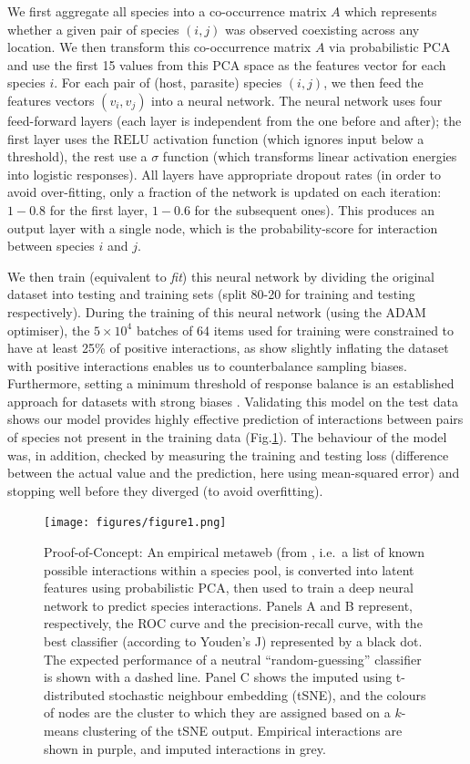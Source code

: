 We first aggregate all species into a co-occurrence matrix \(A\) which
represents whether a given pair of species \((i,j)\) was observed
coexisting across any location. We then transform this co-occurrence
matrix \(A\) via probabilistic PCA \cite{Tipping1999ProPri} and use the
first 15 values from this PCA space as the features vector for each
species \(i\). For each pair of (host, parasite) species \((i,j)\), we
then feed the features vectors \((v_i, v_j)\) into a neural network. The
neural network uses four feed-forward layers (each layer is independent
from the one before and after); the first layer uses the \(\text{RELU}\)
activation function (which ignores input below a threshold), the rest
use a \(\sigma\) function (which transforms linear activation energies
into logistic responses). All layers have appropriate dropout rates (in
order to avoid over-fitting, only a fraction of the network is updated
on each iteration: \(1-0.8\) for the first layer, \(1-0.6\) for the
subsequent ones). This produces an output layer with a single node,
which is the probability-score for interaction between species \(i\) and
\(j\).

We then train (equivalent to \emph{fit}) this neural network by dividing
the original dataset into testing and training sets (split 80-20 for
training and testing respectively). During the training of this neural
network (using the ADAM optimiser), the \(5\times 10^4\) batches of 64
items used for training were constrained to have at least 25\% of
positive interactions, as \cite{Poisot2021ImpMam} show slightly inflating the
dataset with positive interactions enables us to counterbalance sampling
biases. Furthermore, setting a minimum threshold of response balance is
an established approach for datasets with strong biases
\cite{Lemaitre2017ImbPyt}. Validating this model on the test data shows
our model provides highly effective prediction of interactions between
pairs of species not present in the training data (Fig.\ref{fig:example}). The
behaviour of the model was, in addition, checked by measuring the
training and testing loss (difference between the actual value and the
prediction, here using mean-squared error) and stopping well before they
diverged (to avoid overfitting).

\begin{figure}[h]
    \centering
    \texttt{[image: figures/figure1.png]}
    \caption{Proof-of-Concept: An empirical metaweb (from
\cite{Hadfield2014TalTwo}, i.e.~a list of known possible interactions
within a species pool, is converted into latent features using
probabilistic PCA, then used to train a deep neural network to predict
species interactions. Panels A and B represent, respectively, the ROC
curve and the precision-recall curve, with the best classifier
(according to Youden's J) represented by a black dot. The expected
performance of a neutral ``random-guessing'' classifier is shown with a
dashed line. Panel C shows the imputed using t-distributed stochastic
neighbour embedding (tSNE), and the colours of nodes are the cluster to
which they are assigned based on a \(k\)-means clustering of the tSNE
output. Empirical interactions are shown in purple, and imputed
interactions in grey.}
    \label{fig:example}
\end{figure}

